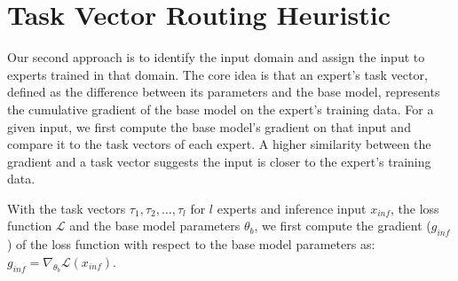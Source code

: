 \begin{table}[!htb]
\centering
{}
\caption{\label{table:data_mix} Data source and weights for CPT or fine-tune MoE or dense models. Wiki1 represents the first half of Wikipedia data for pretraining the base model and Wiki2 represents the second half of Wikipedia data for CPT the knowledge expert.}
\end{table}


\section{Task Vector Routing Heuristic}
\label{sec:task_vector_routing}

Our second approach is to identify the input domain and assign the input to experts trained in that domain. The core idea is that an expert's task vector, defined as the difference between its parameters and the base model, represents the cumulative gradient of the base model on the expert's training data. For a given input, we first compute the base model's gradient on that input and compare it to the task vectors of each expert. A higher similarity between the gradient and a task vector suggests the input is closer to the expert's training data.

With the task vectors $\tau_1, \tau_2, \dots, \tau_l$ for $l$ experts and inference input $x_{inf}$, the loss function $\mathcal{L}$ and the base model parameters $\theta_b$, we first compute the gradient ($g_{inf}$) of the loss function with respect to the base model parameters as: $g_{inf} = \nabla_{\theta_b}\mathcal{L}(x_{inf})$.

